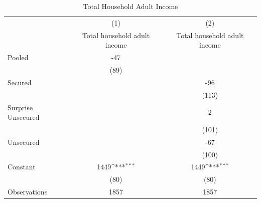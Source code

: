 \begin{table}[htbp]\centering
\def\sym#1{\ifmmode^{#1}\else\(^{#1}\)\fi}
\caption{Total Household Adult Income\label{income99\_lvl\_ITT}}
\begin{tabular}{l*{2}{c}}
\toprule
                    &\multicolumn{1}{c}{(1)}&\multicolumn{1}{c}{(2)}\\
                    &\multicolumn{1}{c}{Total household adult income}&\multicolumn{1}{c}{Total household adult income}\\
\midrule
Pooled              &         -47         &                     \\
                    &        (89)         &                     \\\addlinespace
Secured             &                     &         -96         \\
                    &                     &       (113)         \\\addlinespace
Surprise Unsecured  &                     &           2         \\
                    &                     &       (101)         \\\addlinespace
Unsecured           &                     &         -67         \\
                    &                     &       (100)         \\\addlinespace
Constant            &        1449\sym{***}&        1449\sym{***}\\
                    &        (80)         &        (80)         \\
\midrule
Observations        &        1857         &        1857         \\
\bottomrule
\end{tabular}
\end{table}
